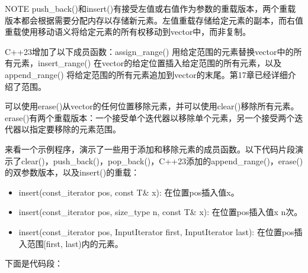 \begin{myNotic}{NOTE}
push\_back()和insert()有接受左值或右值作为参数的重载版本，两个重载版本都会根据需要分配内存以存储新元素。左值重载存储给定元素的副本，而右值重载使用移动语义将给定元素的所有权移动到vector中，而非复制。
\end{myNotic}


C++23增加了以下成员函数：assign\_range() 用给定范围的元素替换vector中的所有元素，insert\_range() 在vector的给定位置插入给定范围的所有元素，以及append\_range() 将给定范围的所有元素追加到vector的末尾。第17章已经详细介绍了范围。

可以使用erase()从vector的任何位置移除元素，并可以使用clear()移除所有元素。erase()有两个重载版本：一个接受单个迭代器以移除单个元素，另一个接受两个迭代器以指定要移除的元素范围。

来看一个示例程序，演示了一些用于添加和移除元素的成员函数。以下代码片段演示了clear()，push\_back()，pop\_back()，C++23添加的append\_range()，erase()的双参数版本，以及insert()的重载：

\begin{itemize}
\item
insert(const\_iterator pos, const T\& x): 在位置pos插入值x。

\item
insert(const\_iterator pos, size\_type n, const T\& x): 在位置pos插入值x n次。

\item
insert(const\_iterator pos, InputIterator first, InputIterator last): 在位置pos插入范围[first, last)内的元素。
\end{itemize}

下面是代码段：

